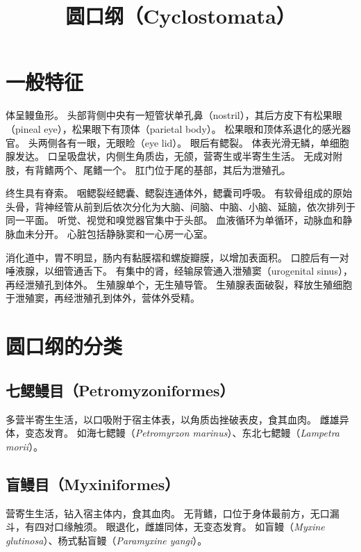 \documentclass[11pt]{article}
\title{圆口纲（Cyclostomata）}
\date{}
\begin{document}
  \maketitle

  \linenumbers
  
\section{一般特征}
体呈鳗鱼形。
头部背侧中央有一短管状单孔鼻（nostril），其后方皮下有松果眼（pineal eye），松果眼下有顶体（parietal body）。
松果眼和顶体系退化的感光器官。
头两侧各有一眼，无眼睑（eye lid）。
眼后有鳃裂。
体表光滑无鳞，单细胞腺发达。
口呈吸盘状，内侧生角质齿，无颌，营寄生或半寄生生活。
无成对附肢，有背鳍两个、尾鳍一个。
肛门位于尾的基部，其后为泄殖孔。

\newline

终生具有脊索。
咽鳃裂经鳃囊、鳃裂连通体外，鳃囊司呼吸。
有软骨组成的原始头骨，背神经管从前到后依次分化为大脑、间脑、中脑、小脑、延脑，依次排列于同一平面。
听觉、视觉和嗅觉器官集中于头部。
血液循环为单循环，动脉血和静脉血未分开。
心脏包括静脉窦和一心房一心室。

\newline

消化道中，胃不明显，肠内有黏膜褶和螺旋瓣膜，以增加表面积。
口腔后有一对唾液腺，以细管通舌下。
有集中的肾，经输尿管通入泄殖窦（urogenital sinus），再经泄殖孔到体外。
生殖腺单个，无生殖导管。
生殖腺表面破裂，释放生殖细胞于泄殖窦，再经泄殖孔到体外，营体外受精。
  
\section{圆口纲的分类}
\subsection{七鳃鳗目（Petromyzoniformes）}
多营半寄生生活，以口吸附于宿主体表，以角质齿挫破表皮，食其血肉。
雌雄异体，变态发育。
如海七鳃鳗（\textit{Petromyrzon marinus}）、东北七鳃鳗（\textit{Lampetra morii}）。

\subsection{盲鳗目（Myxiniformes）}
营寄生生活，钻入宿主体内，食其血肉。
无背鳍，口位于身体最前方，无口漏斗，有四对口缘触须。
眼退化，雌雄同体，无变态发育。
如盲鳗（\textit{Myxine glutinosa}）、杨式黏盲鳗（\textit{Paramyxine yangi}）。
\end{document}

